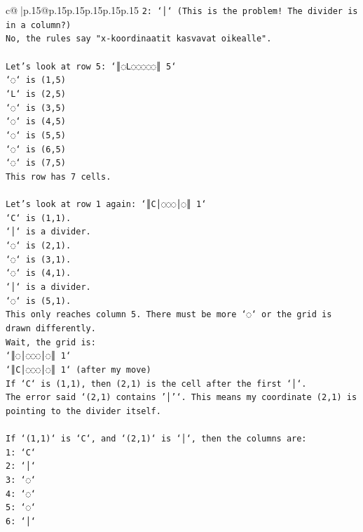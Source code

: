 \documentclass{article}
\begin{document}
{\begin{supertabular}{c@{$\;$}|p{.15\linewidth}@{}p{.15\linewidth}p{.15\linewidth}p{.15\linewidth}p{.15\linewidth}p{.15\linewidth}}
{{{\texttt{2: `│` (This is the problem! The divider is in a column?)} \\
\texttt{No, the rules say "x{-}koordinaatit kasvavat oikealle".} \\
\\ 
\texttt{Let's look at row 5: `║◌L◌◌◌◌◌║ 5`} \\
\texttt{`◌` is (1,5)} \\
\texttt{`L` is (2,5)} \\
\texttt{`◌` is (3,5)} \\
\texttt{`◌` is (4,5)} \\
\texttt{`◌` is (5,5)} \\
\texttt{`◌` is (6,5)} \\
\texttt{`◌` is (7,5)} \\
\texttt{This row has 7 cells.} \\
\\ 
\texttt{Let's look at row 1 again: `║C│◌◌◌│◌║ 1`} \\
\texttt{`C` is (1,1).} \\
\texttt{`│` is a divider.} \\
\texttt{`◌` is (2,1).} \\
\texttt{`◌` is (3,1).} \\
\texttt{`◌` is (4,1).} \\
\texttt{`│` is a divider.} \\
\texttt{`◌` is (5,1).} \\
\texttt{This only reaches column 5. There must be more `◌` or the grid is drawn differently.} \\
\texttt{Wait, the grid is:} \\
\texttt{`║◌│◌◌◌│◌║ 1`} \\
\texttt{`║C│◌◌◌│◌║ 1` (after my move)} \\
\texttt{If `C` is (1,1), then (2,1) is the cell after the first `│`.} \\
\texttt{The error said `(2,1) contains '│'`. This means my coordinate (2,1) is pointing to the divider itself.} \\
\\ 
\texttt{If `(1,1)` is `C`, and `(2,1)` is `│`, then the columns are:} \\
\texttt{1: `C`} \\
\texttt{2: `│`} \\
\texttt{3: `◌`} \\
\texttt{4: `◌`} \\
\texttt{5: `◌`} \\
\texttt{6: `│`} \\
}}}
\end{supertabular}}
\end{document}
